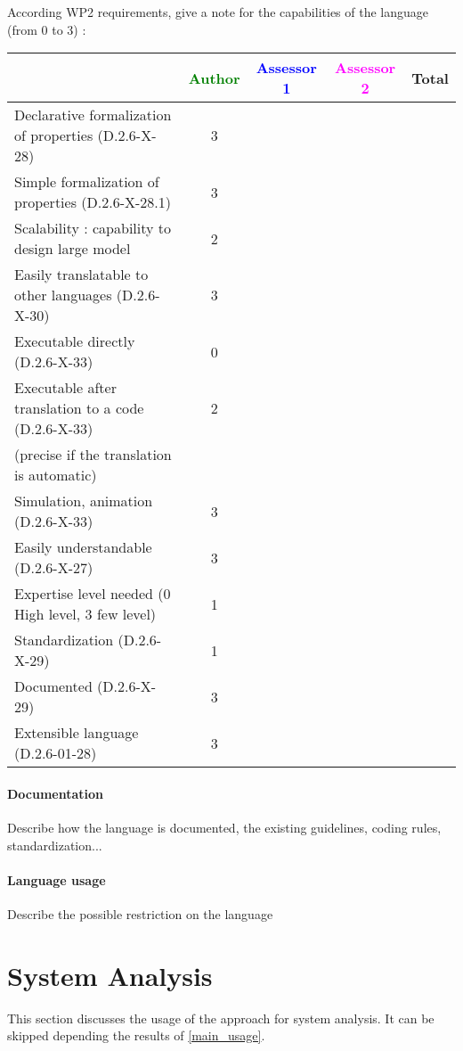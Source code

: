 According WP2 requirements, give a note for the capabilities of the language (from 0 to 3) :

\begin{tabular}{|l | c | c | c | c|}
\hline
& \textcolor{green}{Author} & \textcolor{blue}{Assessor 1} & \textcolor{magenta}{Assessor 2} & Total \\
\hline
Declarative formalization of properties (D.2.6-X-28) & 3 & & & \\
\hline
Simple formalization of properties (D.2.6-X-28.1) & 3 & & & \\
\hline
Scalability : capability to design large model & 2 & & & \\
\hline
Easily translatable to other languages (D.2.6-X-30) & 3 & & & \\
\hline
Executable directly (D.2.6-X-33) & 0 & & & \\
\hline
Executable after translation to a code (D.2.6-X-33) & 2 & & & \\
(precise if the translation is automatic) & & & & \\
\hline
Simulation, animation (D.2.6-X-33) & 3 & & & \\
\hline
Easily understandable (D.2.6-X-27) & 3 & & & \\
\hline
Expertise level needed (0 High level, 3 few level) & 1 & & & \\
\hline
Standardization (D.2.6-X-29) & 1 & & & \\
\hline
Documented (D.2.6-X-29) & 3 & & & \\
\hline
Extensible language (D.2.6-01-28) & 3 & & & \\
\hline
\end{tabular}


\paragraph{Documentation} Describe how the language is documented, the existing guidelines, coding rules, standardization...

\paragraph{Language usage} Describe the possible restriction on the language

\section{System Analysis}
This section discusses the usage of the approach for system analysis.
It can be skipped depending the results of \ref{main_usage}.

